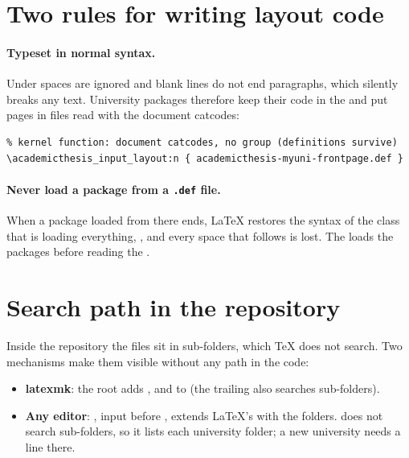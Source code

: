 \section{Two rules for writing layout code}
\label{sec:catcodes}

\paragraph{Typeset in normal syntax.} Under  spaces are
ignored and blank lines do not end paragraphs, which silently breaks any
text. University packages therefore keep their  code in the
 and put pages in  files read with the document
catcodes:

\begin{lstlisting}
% kernel function: document catcodes, no group (definitions survive)
\academicthesis_input_layout:n { academicthesis-myuni-frontpage.def }
\end{lstlisting}

\paragraph{Never load a package from a \texttt{.def} file.} When a package
loaded from there ends, \LaTeX{} restores the syntax of the class that is
loading everything, , and every space that follows is lost. The
 loads the packages before reading the .

\section{Search path in the repository}
\label{sec:searchpath}

Inside the repository the files sit in sub-folders, which \TeX{} does not
search. Two mechanisms make them visible without any path in the code:

\begin{itemize}
  \item \textbf{latexmk}: the root  adds ,
     and  to  (the
    trailing \opt{//} also searches sub-folders).
  \item \textbf{Any editor}: ,
    input before , extends \LaTeX's  with
    the folders.  does not search sub-folders, so it lists
    each university folder; a new university needs a line there.
\end{itemize}

